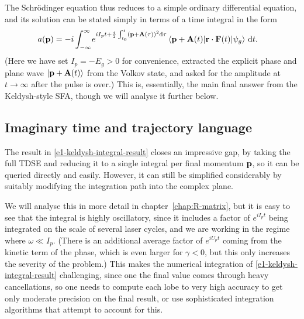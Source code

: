 The Schrödinger equation thus reduces to a simple ordinary differential equation, and its solution can be stated simply in terms of a time integral in the form
\begin{align}
a(\vbp)
& =
-i
\int_{-\infty}^{\infty} \!
e^{iI_p t+\frac i2 \int_{\tn}^{t} \left(\vbp+\vba(\tau)\right)^2 \d\tau}\matrixel{\vbp+\vba(t)}{\vbr\cdot\vbf(t)}{\psi_g}
\, \mathrm dt
.
\label{e1-keldysh-integral-result}
\end{align}
(Here we have set $I_p=-E_g>0$ for convenience, extracted the explicit phase and plane wave $\ket{\vb{p}+\vb{A}(t)}$ from the Volkov state, and asked for the amplitude at $t\to\infty$ after the pulse is over.)  This is, essentially, the main final answer from the Keldysh-style SFA, though we will analyse it further below. 




\subsection{Imaginary time and trajectory language}
The result in \eqref{e1-keldysh-integral-result} closes an impressive gap, by taking the full TDSE and reducing it to a single integral per final momentum $\vb{p}$, so it can be queried directly and easily. However, it can still be simplified considerably by suitably modifying the integration path into the complex plane. 

We will analyse  this in more detail in chapter~\ref{chap:R-matrix}, but it is easy to see that the integral is highly oscillatory, since it includes a factor of $e^{iI_pt}$ being integrated on the scale of several laser cycles, and we are working in the regime where $\omega \ll I_p$. (There is an additional average factor of $e^{iU_pt}$ coming from the kinetic term of the phase, which is even larger for $\gamma<0$, but this only increases the severity of the problem.) This makes the numerical integration of \eqref{e1-keldysh-integral-result} challenging, since one the final value comes through heavy cancellations, so one needs to compute each lobe to very high accuracy to get only moderate precision on the final result, or use sophisticated integration algorithms that attempt to account for this.

